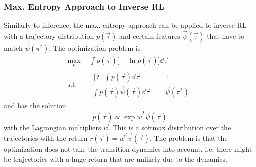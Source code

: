 			\subsubsection{Max. Entropy Approach to Inverse RL}
				Similarly to inference, the max. entropy approach can be applied to inverse RL with a trajectory distribution \( p(\vec{\tau}) \) and certain features \( \vec{\psi}(\vec{\tau}) \) that have to match \( \vec{\psi}(\pi^\ast) \). The optimization problem is
				\begin{equation*}
					\begin{aligned}
						\max_p \,           & \int\! p(\vec{\tau}) \big[\! -\!\ln p(\vec{\tau}) \big] \dd{\vec{\tau}} \\
						\mathrm{s.t.} \quad &
						\begin{aligned}[t]
							\int\! p(\vec{\tau}) \dd{\vec{\tau}}                        & = 1                    \\
							\int\! p(\vec{\tau}) \vec{\psi}(\vec{\tau}) \dd{\vec{\tau}} & = \vec{\psi}(\pi^\ast)
						\end{aligned}
					\end{aligned}
				\end{equation*}
				and has the solution
				\begin{equation*}
					p(\vec{\tau}) \propto \exp{ \vec{w}^T \vec{\psi}(\vec{\tau}) }
				\end{equation*}
				with the Lagrangian multipliers \(\vec{w}\). This is a softmax distribution over the trajectories with the return \( r(\vec{\tau}) = \vec{w}^T \vec{\psi}(\vec{\tau}) \). The problem is that the optimization does not take the transition dynamics into account, i.e. there might be trajectories with a huge return that are unlikely due to the dynamics.

